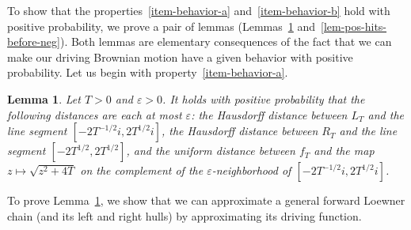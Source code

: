 \documentclass[11pt]{article}
\theoremstyle{plain}
\newtheorem{lem}[thm]{Lemma}
\theoremstyle{definition}
\numberwithin{equation}{section}
\newcommand{\ep}{\varepsilon}
\begin{document}
To show that the properties~\ref{item-behavior-a} and~\ref{item-behavior-b} hold with positive probability, we prove a pair of lemmas (Lemmas~\ref{lem-line-approx} and~\ref{lem-pos-hits-before-neg}).
Both lemmas are elementary consequences of the fact that we can make our driving Brownian motion have a given behavior with positive probability.
Let us begin with property~\ref{item-behavior-a}.


\begin{lem} \label{lem-line-approx}
Let $T >0$ and $\ep > 0$. It holds with positive probability that the following distances are each at most $\ep$: the Hausdorff distance between $L_T$ and the line segment $[-2T^{-1/2} i , 2T^{1/2} i]$, the Hausdorff distance between $R_T$ and the line segment $[-2T^{1/2} , 2T^{1/2}]$, and the uniform distance between $f_T$ and the map $z\mapsto \sqrt{z^2+4T}$ on the complement of the $\ep$-neighborhood of $ [-2T^{-1/2} i , 2T^{1/2} i] $.  
\end{lem} 

To prove Lemma~\ref{lem-line-approx}, we show that we can approximate a general forward Loewner chain (and its left and right hulls) by approximating its driving function.  
\end{document}
